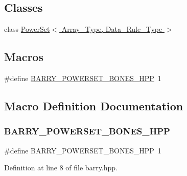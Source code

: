 \subsection*{Classes}
\begin{DoxyCompactItemize}
\item 
class \hyperlink{class_power_set}{Power\+Set$<$ Array\+\_\+\+Type, Data\+\_\+\+Rule\+\_\+\+Type $>$}
\end{DoxyCompactItemize}
\subsection*{Macros}
\begin{DoxyCompactItemize}
\item 
\#define \hyperlink{barry_8hpp_a08303757f391a3a39e22f83083f39948}{B\+A\+R\+R\+Y\+\_\+\+P\+O\+W\+E\+R\+S\+E\+T\+\_\+\+B\+O\+N\+E\+S\+\_\+\+H\+PP}~1
\end{DoxyCompactItemize}


\subsection{Macro Definition Documentation}
\mbox{\label{barry_8hpp_a08303757f391a3a39e22f83083f39948}} 
\subsubsection{\texorpdfstring{B\+A\+R\+R\+Y\+\_\+\+P\+O\+W\+E\+R\+S\+E\+T\+\_\+\+B\+O\+N\+E\+S\+\_\+\+H\+PP}{BARRY\_POWERSET\_BONES\_HPP}}
{\footnotesize\ttfamily \#define B\+A\+R\+R\+Y\+\_\+\+P\+O\+W\+E\+R\+S\+E\+T\+\_\+\+B\+O\+N\+E\+S\+\_\+\+H\+PP~1}



Definition at line 8 of file barry.\+hpp.

